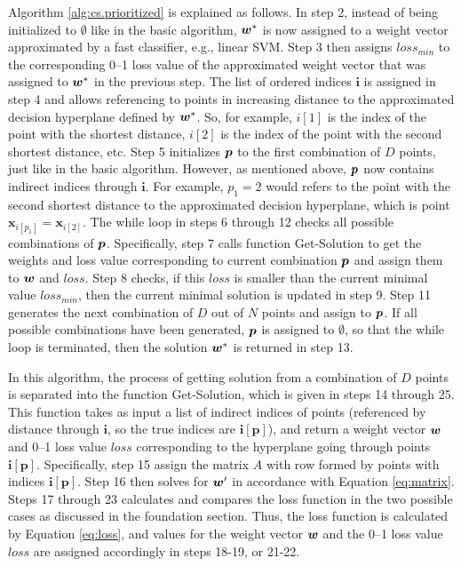 Algorithm \ref{alg:cs.prioritized} is explained as follows. In step 2, instead of being initialized to $\emptyset$ like in the basic algorithm, $\boldsymbol{w}^*$ is now assigned to a weight vector approximated by a fast classifier, e.g., linear SVM. Step 3 then assigns $loss_{min}$ to the corresponding 0--1 loss value of the approximated weight vector that was assigned to $\boldsymbol{w}^*$ in the previous step. The list of ordered indices $\boldsymbol{i}$ is assigned in step 4 and allows referencing to points in increasing distance to the approximated decision hyperplane defined by $\boldsymbol{w}^*$. So, for example, $i[1]$ is the index of the point with the shortest distance, $i[2]$ is the index of the point with the second shortest distance, etc. Step 5 initializes $\boldsymbol{p}$ to the first combination of $D$ points, just like in the basic algorithm. However, as mentioned above, $\boldsymbol{p}$ now contains indirect indices through $\boldsymbol{i}$. For example, $p_1 = 2$ would refers to the point with the second shortest distance to the approximated decision hyperplane, which is point $\boldsymbol{x}_{i[p_1]} = \boldsymbol{x}_{i[2]}$. The while loop in steps 6 through 12 checks all possible combinations of $\boldsymbol{p}$. Specifically, step 7 calls function {\sc Get-Solution} to get the weights and loss value corresponding to current combination $\boldsymbol{p}$ and assign them to $\boldsymbol{w}$ and $loss$. Step 8 checks, if this $loss$ is smaller than the current minimal value $loss_{min}$, then the current minimal solution is updated in step 9. Step 11 generates the next combination of $D$ out of $N$ points and assign to $\boldsymbol{p}$. If all possible combinations have been generated, $\boldsymbol{p}$ is assigned to $\emptyset$, so that the while loop is terminated, then the solution $\boldsymbol{w}^*$ is returned in step 13. 

In this algorithm, the process of getting solution from a combination of $D$ points is separated into the function {\sc Get-Solution}, which is given in steps 14 through 25. This function takes as input a list of indirect indices of points (referenced by distance through $\boldsymbol{i}$, so the true indices are $\boldsymbol{i[p]}$), and return a weight vector $\boldsymbol{w}$ and 0--1 loss value $loss$ corresponding to the hyperplane going through points $\boldsymbol{i[p]}$. Specifically, step 15 assign the matrix $A$ with row formed by points with indices $\boldsymbol{i[p]}$. Step 16 then solves for $\boldsymbol{w}'$ in accordance with Equation \ref{eq:matrix}. Steps 17 through 23 calculates and compares the loss function in the two possible cases as discussed in the foundation section. Thus, the loss function is calculated by Equation \ref{eq:loss}, and values for the weight vector $\boldsymbol{w}$ and the 0--1 loss value $loss$ are assigned accordingly in steps 18-19, or 21-22. 

